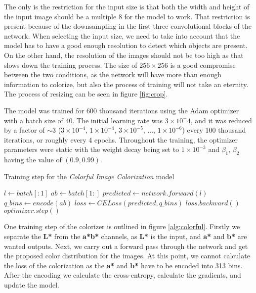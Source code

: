 The only is the restriction for the input size is that both the width and height
of the input image should be a multiple $8$ for the model to work. That restriction
is present because of the downsampling in the first three convolutional blocks of
the network. When selecting the input size, we need to take into account that the
model has to have a good enough resolution to detect which objects are present. On 
the other hand, the resolution of the images should not be too high as that slows 
down the training process. The size of $256\times256$ is a good compromise between
the two conditions, as the network will have more than enough information to colorize, 
but also the process of training will not take an eternity. The process of resizing 
can be seen in figure \ref{fig:crop}.

The model was trained for 600 thousand iterations using the Adam optimizer \citep{diederik2015adam}
with a batch size of 40. The initial learning rate was $3\times10^-4$, and it was
reduced by a factor of $\sim$3 ($3\times10^{-4}$, $1\times10^{-4}$, $3\times10^{-5}$,
..., $1\times10^{-6}$) every 100 thousand iterations, or roughly every 4 epochs. 
Throughout the training, the optimizer parameters were static with the weight decay
being set to $1\times10^{-3}$ and $\beta_1$, $\beta_2$ having the value of $(0.9, 0.99)$.

\begin{algorithm}[!ht]
	\caption{Training step for the \textit{Colorful Image Colorization} model}
	\label{alg:colorful}
	\begin{algorithmic}		
			\State $l \leftarrow batch[:1]$	
			\State $ab \leftarrow batch[1:]$
			\State $predicted \leftarrow network.forward(l)$	
			\State $q\_bins \leftarrow encode(ab)$
			\State $loss \leftarrow CELoss(predicted, q\_bins)$
			\State $loss.backward()$
			\State $optimizer.step()$
		\EndFunction
	\end{algorithmic}
\end{algorithm}

One training step of the colorizer is outlined in figure \ref{alg:colorful}. 
Firstly we separate the \textbf{L*} from the \textbf{a*b*} channels, as \textbf{L*}
is the input, and \textbf{a*} and \textbf{b*} are wanted outputs. Next, 
we carry out a forward pass through the network and get the proposed color 
distribution for the images. At this point, we cannot calculate the loss of the
colorization as the \textbf{a*} and \textbf{b*} have to be encoded into 313 bins.
After the encoding we calculate the cross-entropy, calculate the gradients, and 
update the model.

